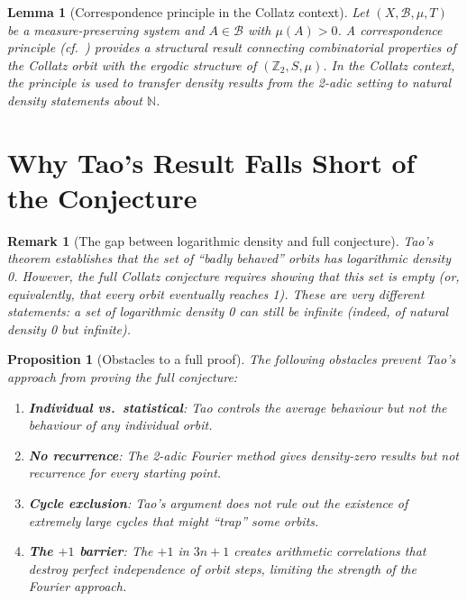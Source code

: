 \documentclass[12pt,a4paper]{article}
\newtheorem{lemma}[theorem]{Lemma}
\newtheorem{proposition}[theorem]{Proposition}
\newtheorem{remark}[theorem]{Remark}
\begin{document}
\begin{lemma}[Correspondence principle in the Collatz context]\label{lem:furstenberg}
Let $(X, \mathcal{B}, \mu, T)$ be a measure-preserving system and $A \in \mathcal{B}$
with $\mu(A) > 0$. A correspondence principle (cf.~\cite{Tao2022}) provides a structural result
connecting combinatorial properties of the Collatz orbit with the ergodic structure of
$(\mathbb{Z}_2, S, \mu)$.
In the Collatz context, the principle is used to transfer density results from the
2-adic setting to natural density statements about $\mathbb{N}$.
\end{lemma}

\section{Why Tao's Result Falls Short of the Conjecture}

\begin{remark}[The gap between logarithmic density and full conjecture]\label{rem:gap}
Tao's theorem establishes that the set of ``badly behaved'' orbits has logarithmic density 0.
However, the full Collatz conjecture requires showing that this set is \emph{empty} (or,
equivalently, that every orbit eventually reaches 1). These are very different statements:
a set of logarithmic density 0 can still be infinite (indeed, of natural density 0 but
infinite).
\end{remark}

\begin{proposition}[Obstacles to a full proof]\label{prop:obstacles}
The following obstacles prevent Tao's approach from proving the full conjecture:
\begin{enumerate}
  \item \textbf{Individual vs.\ statistical}: Tao controls the average behaviour but not
        the behaviour of any individual orbit.
  \item \textbf{No recurrence}: The 2-adic Fourier method gives density-zero results but
        not recurrence for every starting point.
  \item \textbf{Cycle exclusion}: Tao's argument does not rule out the existence of
        extremely large cycles that might ``trap'' some orbits.
  \item \textbf{The $+1$ barrier}: The $+1$ in $3n+1$ creates arithmetic correlations
        that destroy perfect independence of orbit steps, limiting the strength of the
        Fourier approach.
\end{enumerate}
\end{proposition}
\end{document}
